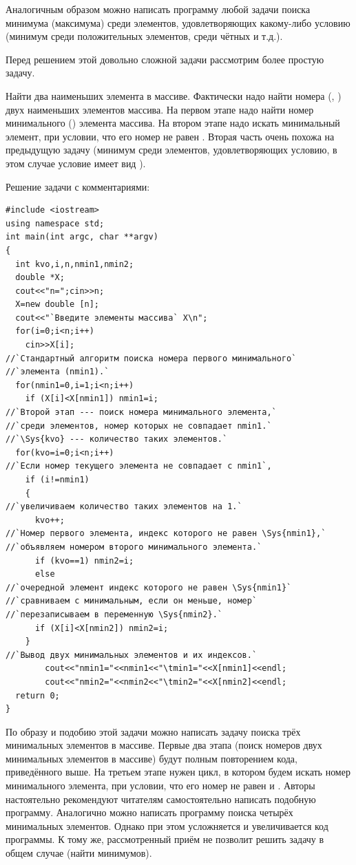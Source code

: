 Аналогичным образом можно написать программу любой задачи поиска минимума (максимума) среди элементов, удовлетворяющих
какому-либо условию (минимум среди положительных элементов, среди чётных и т.д.). 


Перед решением этой довольно сложной задачи рассмотрим более простую задачу.

Найти два наименьших элемента в массиве. Фактически надо найти номера
(, ) двух наименьших элементов
массива. На первом этапе надо найти номер минимального () элемента массива. На втором этапе
надо искать минимальный элемент, при условии, что его номер не равен . Вторая часть очень
похожа на предыдущую задачу (минимум среди элементов, удовлетворяющих условию, в этом случае условие имеет вид
).

Решение задачи с комментариями:

\begin{lstlisting}
#include <iostream>
using namespace std;
int main(int argc, char **argv)
{
  int kvo,i,n,nmin1,nmin2;
  double *X;
  cout<<"n=";cin>>n;
  X=new double [n];
  cout<<"`Введите элементы массива` X\n";
  for(i=0;i<n;i++)
    cin>>X[i];
//`Стандартный алгоритм поиска номера первого минимального` 
//`элемента (nmin1).`
  for(nmin1=0,i=1;i<n;i++)
    if (X[i]<X[nmin1]) nmin1=i;
//`Второй этап --- поиск номера минимального элемента,` 
//`среди элементов, номер которых не совпадает nmin1.`
//`\Sys{kvo} --- количество таких элементов.`
  for(kvo=i=0;i<n;i++)
//`Если номер текущего элемента не совпадает с nmin1`,
    if (i!=nmin1) 
    {
//`увеличиваем количество таких элементов на 1.`
      kvo++;
//`Номер первого элемента, индекс которого не равен \Sys{nmin1},` 
//`объявляем номером второго минимального элемента.`
      if (kvo==1) nmin2=i; 
      else
//`очередной элемент индекс которого не равен \Sys{nmin1}` 
//`сравниваем с минимальным, если он меньше, номер`
//`перезаписываем в переменную \Sys{nmin2}.`
      if (X[i]<X[nmin2]) nmin2=i;
    }
//`Вывод двух минимальных элементов и их индексов.`
        cout<<"nmin1="<<nmin1<<"\tmin1="<<X[nmin1]<<endl;
        cout<<"nmin2="<<nmin2<<"\tmin2="<<X[nmin2]<<endl;
  return 0;
}
\end{lstlisting}


По образу и подобию этой задачи можно написать задачу поиска трёх минимальных элементов в массиве. Первые два этапа
(поиск номеров двух минимальных элементов в массиве) будут полным повторением кода, приведённого выше. На третьем этапе
нужен цикл, в котором будем искать номер минимального элемента, при условии, что его номер не равен
 и . Авторы настоятельно рекомендуют читателям самостоятельно написать
подобную программу. Аналогично можно написать программу поиска четырёх минимальных элементов. Однако при этом
усложняется и увеличивается код программы. К тому же, рассмотренный приём не позволит решить задачу в общем случае
(найти  минимумов). 

